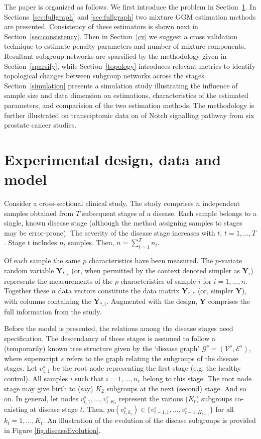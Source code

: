 \documentclass[10pt]{article}
\begin{document}
\medskip
The paper is organized as follows. We first introduce the problem in Section~\ref{sec:design}. In Sections~\ref{sec:fullgraph} and \ref{sec:fullgraph} two mixture GGM estimation methods are presented. Consistency of these estimators is shown next in Section~\ref{sec:consistency}. Then in Section~\ref{cv} we suggest a cross validation technique to estimate penalty parameters and number of mixture components. Resultant subgroup networks are sparsified by the methodology given in Section~\ref{sparsify}, while Section~\ref{topology} introduces relevant metrics to identify topological changes between subgroup networks across the stages. Section~\ref{simulation} presents a simulation study illustrating the influence of sample size and data dimension on estimations, characteristics of the estimated parameters, and comparision of the two estimation methods.  The methodology is further illustrated on transciptomic data on of Notch signalling pathway from six prostate cancer studies.






\section{Experimental design, data and model}\label{sec:design}
Consider a cross-sectional clinical study. The study comprises $n$ independent samples obtained from $T$ subsequent stages of a disease. Each sample belongs to a single, known disease stage (although the method assigning samples to stages may be error-prone). The severity of the disease stage increases with $t$, $t=1, \ldots, T$. Stage $t$ includes $n_t$ samples. Then, $n = \sum_{t=1}^T n_t$.

Of each sample the same $p$ characteristics have been measured. The $p$-variate random variable $\mathbf{Y}_{\ast, i}$ (or, when permitted by the context denoted simpler as $\mathbf{Y}_i$) represents the measurements of the $p$ characteristics of sample $i$ for $i=1, \ldots, n$. Together these $n$ data vectors constitute the data matrix $\mathbf{Y}_{\ast, \ast}$ (or, simpler $\mathbf{Y}$), with columns containing the $\mathbf{Y}_{\ast, i}$. Augmented with the design, $\mathbf{Y}$ comprises the full information from the study.

Before the model is presented, the relations among the disease stages need specification. The descendancy of these stages is assumed to follow a (temporarily) known tree structure given by the `disease graph' $\mathcal{G}^s = (\mathcal{V}^s, \mathcal{E}^s)$, where superscript $s$ refers to the graph relating the subgroups of the disease stages. Let $v_{1,1}^s$ be the root node representing the first stage (e.g. the healthy control). All samples $i$ such that $i = 1, \ldots, n_1$ belong to this stage. The root node stage may give birth to (say) $K_2$ subgroups at the next (second) stage. And so on. In general, let nodes $v_{t,1}^s, \ldots, v_{t, K_t}^s$ represent the various ($K_t$) subgroups co-existing at disease stage $t$. Then, $pa(v_{t, k_t}^s) \in \{ v_{t-1, 1}^s, \ldots, v_{t-1, K_{t-1}}^s \}$ for all $k_t = 1, \ldots, K_t$. An illustration of the evolution of the disease subgroups is provided in Figure \ref{fig.diseaseEvolution}.
\end{document}
